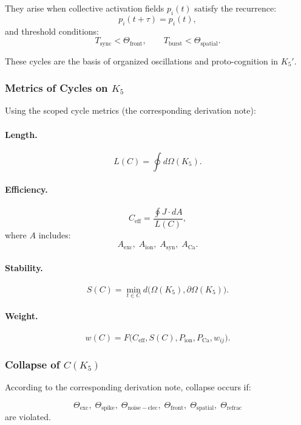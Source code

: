 They arise when collective activation fields
$p_i(t)$ satisfy the recurrence:
\[
  p_i(t+\tau) = p_i(t),
\]
and threshold conditions:
\[
  T_{\mathrm{sync}} < \Theta_{\mathrm{front}},\qquad
  T_{\mathrm{burst}} < \Theta_{\mathrm{spatial}}.
\]

These cycles are the basis of organized oscillations and
proto-cognition in $K_5'$.

\subsubsection{Metrics of Cycles on \texorpdfstring{$K_5$}{K_5}}

Using the scoped cycle metrics (the corresponding derivation note):

\paragraph{Length.}
\[
  L(C)=\oint d\Omega(K_5).
\]

\paragraph{Efficiency.}
\[
  C_{\mathrm{eff}}=\frac{\oint J\cdot dA}{L(C)},
\]
where $A$ includes:
\[
  A_{\mathrm{exc}},\;
  A_{\mathrm{ion}},\;
  A_{\mathrm{syn}},\;
  A_{\mathrm{Ca}}.
\]

\paragraph{Stability.}
\[
  S(C) =
    \min\limits_{t\in C}
      d\bigl(\Omega(K_5),\partial\Omega(K_5)\bigr).
\]

\paragraph{Weight.}
\[
  w(C) =
    F\bigl(C_{\mathrm{eff}}, S(C), P_{\mathrm{ion}},
      P_{\mathrm{Ca}}, w_{ij}\bigr).
\]

\subsubsection{Collapse of \texorpdfstring{$C(K_5)$}{C(K_5)}}

According to the corresponding derivation note, collapse occurs if:

\[
  \Theta_{\mathrm{exc}},\;
  \Theta_{\mathrm{spike}},\;
  \Theta_{\mathrm{noise-elec}},\;
  \Theta_{\mathrm{front}},\;
  \Theta_{\mathrm{spatial}},\;
  \Theta_{\mathrm{refrac}}
\]
are violated.

